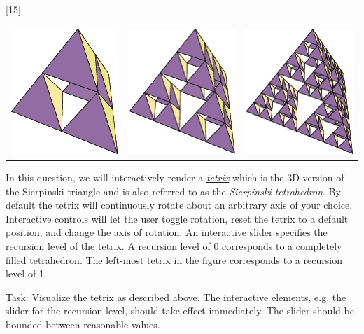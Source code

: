 \documentclass[addpoints]{exam}
\begin{document}
\begin{questions}
[15]

  \begin{tabular}{ccc}
    \includegraphics[width=.3\textwidth]{tetrix1}
    & \includegraphics[width=.3\textwidth]{tetrix2}
    & \includegraphics[width=.3\textwidth]{tetrix3}
  \end{tabular}
  In this question, we will interactively render a \href{http://mathworld.wolfram.com/Tetrix.html}{\it tetrix} which is the 3D version of the Sierpinski triangle and is also referred to as the \textit{Sierpinski tetrahedron}. By default the tetrix will continuously rotate about an arbitrary axis of your choice. Interactive controls will let the user toggle rotation, reset the tetrix to a default position, and change the axis of rotation. An interactive slider specifies the recursion level of the tetrix. A recursion level of 0 corresponds to a completely filled tetrahedron. The left-most tetrix in the figure corresponds to a recursion level of 1.

  \underline{Task}: Visualize the tetrix as described above. The interactive elements, e.g. the slider for the recursion level, should take effect immediately. The slider should be bounded between reasonable values.


\end{questions}
\end{document}
